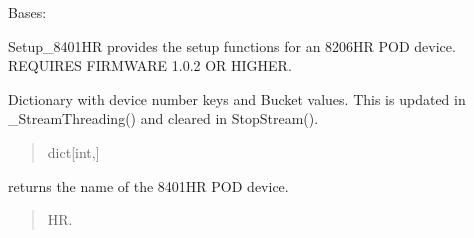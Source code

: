 \documentclass[letterpaper,10pt,english]{sphinxmanual}
\begin{document}
\begin{fulllineitems}
\label{\detokenize{Setup.SetupOneDevice:Setup.SetupOneDevice.Setup_8401HR.Setup8401HR}}
\pysigstartsignatures
{}
\pysigstopsignatures
\sphinxAtStartPar
Bases: {\hyperref[\detokenize{Setup.SetupOneDevice:Setup.SetupOneDevice.Setup_PodInterface.SetupInterface}]{}}

\sphinxAtStartPar
Setup\_8401HR provides the setup functions for an 8206\sphinxhyphen{}HR POD device.     REQUIRES FIRMWARE 1.0.2 OR HIGHER.

\begin{fulllineitems}
\label{\detokenize{Setup.SetupOneDevice:Setup.SetupOneDevice.Setup_8401HR.Setup8401HR._bucketAccess}}
\pysigstartsignatures
{}
\pysigstopsignatures
\sphinxAtStartPar
Dictionary with device number keys and Bucket values.             This is updated in \_StreamThreading() and cleared in StopStream().
\begin{quote}\begin{description}
\sphinxAtStartPar
dict{[}int,{\hyperref[\detokenize{PodApi.Stream.Collect:PodApi.Stream.Collect.DataBucket.Bucket}]{}}{]}

\end{description}\end{quote}

\end{fulllineitems}


\begin{fulllineitems}
\label{\detokenize{Setup.SetupOneDevice:Setup.SetupOneDevice.Setup_8401HR.Setup8401HR.GetDeviceName}}
\pysigstartsignatures
{}
\pysigstopsignatures
\sphinxAtStartPar
returns the name of the 8401\sphinxhyphen{}HR POD device.
\begin{quote}\begin{description}
\sphinxhyphen{}HR.


\end{description}
\end{quote}
\end{fulllineitems}
\end{fulllineitems}
\end{document}
